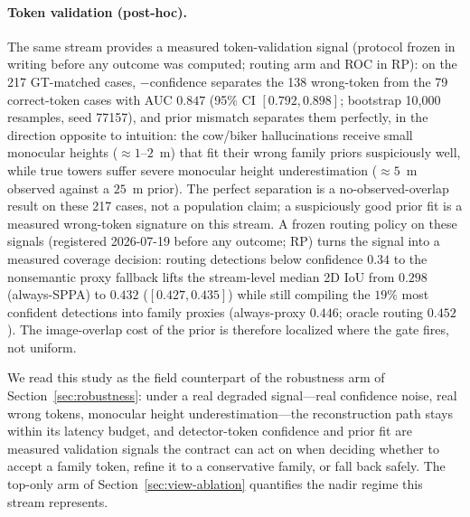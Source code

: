 \documentclass[11pt,a4paper]{article}
\begin{document}
\paragraph{Token validation (post-hoc).}
The same stream provides a measured token-validation signal (protocol frozen
in writing before any outcome was computed; routing arm and ROC in RP):
on the 217 GT-matched cases,
\(-\)confidence separates the 138 wrong-token from the 79 correct-token cases
with AUC \(0.847\) (95\% CI \([0.792,0.898]\); bootstrap 10{,}000 resamples,
seed 77157), and prior mismatch separates them perfectly, in the
direction opposite to intuition: the
cow/biker hallucinations receive small monocular heights
(\(\approx\)\(1\)--\(2\)~m) that fit their wrong family priors suspiciously
well, while true towers suffer severe monocular height underestimation
(\(\approx\)\(5\)~m observed against a \(25\)~m prior). The perfect
separation is a no-observed-overlap result on these 217 cases, not a
population claim; a suspiciously good prior fit is a measured wrong-token
signature on this stream. A frozen routing policy on these signals
(registered 2026-07-19 before any outcome; RP) turns the signal into a
measured coverage decision: routing detections below confidence \(0.34\) to
the nonsemantic proxy fallback lifts the stream-level median 2D IoU from
\(0.298\) (always-SPPA) to \(0.432\) (\([0.427,0.435]\)) while still
compiling the \(19\%\) most confident detections into family proxies
(always-proxy \(0.446\); oracle routing \(0.452\)). The image-overlap cost
of the prior is therefore localized where the gate fires, not uniform.

We read this study as the field counterpart of the robustness arm of
Section~\ref{sec:robustness}: under a real degraded signal---real confidence
noise, real wrong tokens, monocular height underestimation---the
reconstruction path stays within its latency budget, and detector-token
confidence and prior fit are measured validation signals the contract can
act on when deciding whether to accept a family token, refine it to a
conservative family, or fall back safely. The top-only arm of
Section~\ref{sec:view-ablation} quantifies the nadir regime this stream
represents.
\end{document}
